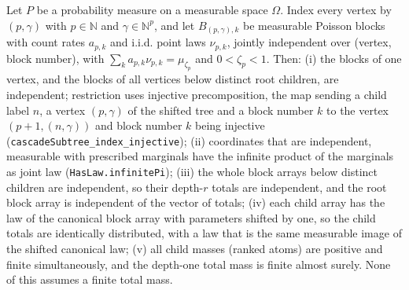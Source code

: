 \begin{lemma}
  \label{lem:sg:cascade-conditional}
  \leanok
Let $P$ be a probability measure on a measurable space $\Omega$. Index every
vertex by $(p,\gamma)$ with $p\in\mathbb N$ and $\gamma\in\mathbb N^p$, and let
$B_{(p,\gamma),k}$ be measurable Poisson blocks with count rates $a_{p,k}$ and i.i.d.
point laws $\nu_{p,k}$, jointly independent over (vertex, block number), with
$\sum_k a_{p,k}\nu_{p,k}=\mu_{\zeta_p}$ and $0<\zeta_p<1$. Then:
(i) the blocks of one vertex, and the blocks of all vertices below distinct root children,
are independent; restriction uses injective precomposition, the map sending a child label $n$,
a vertex $(p,\gamma)$ of the shifted tree and a block number $k$ to the vertex
$(p+1,(n,\gamma))$ and block number $k$ being injective
(\texttt{cascadeSubtree\_index\_injective}); (ii) coordinates that are independent,
measurable with prescribed marginals have the infinite product of the marginals as joint law
(\texttt{HasLaw.infinitePi}); (iii) the whole block arrays below distinct children are independent,
so their depth-$r$ totals are independent, and the root block array is independent of the vector of
totals; (iv) each child array has the law of the canonical block array with parameters shifted by one,
so the child totals are identically distributed, with a law that is the same measurable image
of the shifted canonical law; (v) all child masses (ranked atoms) are positive and finite simultaneously, and the
depth-one total mass is finite almost surely. None of this assumes a finite total mass.


\end{lemma}
